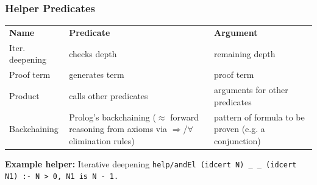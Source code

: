 \documentclass{beamer}
\begin{document}
\begin{frame}[fragile]
    \frametitle{Helper Predicates}
        \renewcommand{\arraystretch}{1.5}
    \begin{tabular}{l p{3.5cm} p{3.5cm}}
        \textbf{Name} & \textbf{Predicate} & \textbf{Argument} \\
        Iter. deepening & checks depth & remaining depth \\
        Proof term & generates term & proof term \\
        Product & calls other predicates & arguments for other predicates \\
        Backchaining &
            \footnotesize Prolog's backchaining ($\approx$ forward reasoning from axioms via $\Rightarrow$/$\forall$ elimination rules) &
            \footnotesize pattern of formula to be proven (e.g. a conjunction) \\
    \end{tabular}

    \vspace{1.5em}
    \begin{block}{\textbf{Example helper:} Iterative deepening}
        \lstinline[language=ELPI,keepspaces=true]|help/andEl (idcert N) _ _ (idcert N1) :- N > 0, N1 is N - 1.|
    \end{block}

% 
\end{frame}
\end{document}
